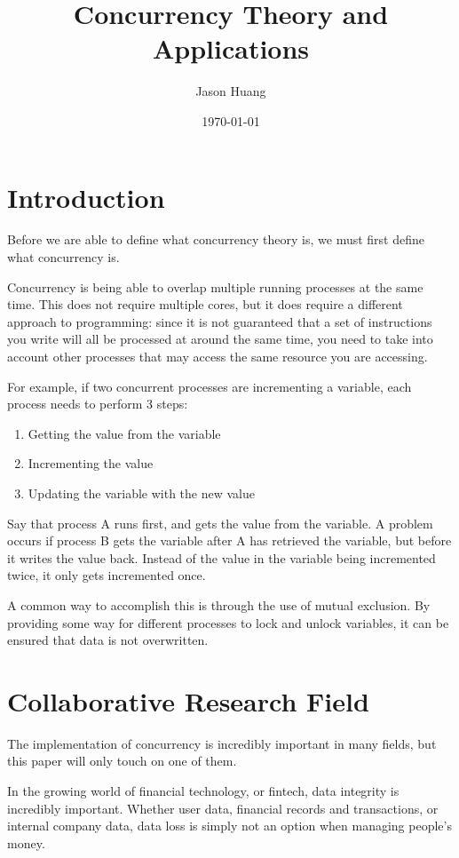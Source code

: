 \documentclass[jou]{apa7}
\title{Concurrency Theory and Applications}
\author{Jason Huang}
\date{\today}
\begin{document}
\maketitle

\section{Introduction}
Before we are able to define what concurrency theory is,
we must first define what concurrency is.

Concurrency is being able to overlap multiple running processes at the same time.
This does not require multiple cores,
but it does require a different approach to programming:
since it is not guaranteed that a set of instructions you write will all be processed at around the same time,
you need to take into account other processes that may access the same resource you are accessing.

For example, if two concurrent processes are incrementing a variable,
each process needs to perform 3 steps:

\begin{enumerate}
  \item Getting the value from the variable
  \item Incrementing the value
  \item Updating the variable with the new value
\end{enumerate}

Say that process A runs first, and gets the value from the variable.
A problem occurs if process B gets the variable after A has retrieved the variable, but before it writes the value back.
Instead of the value in the variable being incremented twice, it only gets incremented once.

A common way to accomplish this is through the use of mutual exclusion.
By providing some way for different processes to lock and unlock variables,
it can be ensured that data is not overwritten.
\autocite{lamportTuringLectureTheComputer2015}

\section{Collaborative Research Field}
The implementation of concurrency is incredibly important in many fields,
but this paper will only touch on one of them.

In the growing world of financial technology, or fintech,
data integrity is incredibly important.
Whether user data, financial records and transactions, or internal company data,
data loss is simply not an option when managing people's money.
\end{document}
